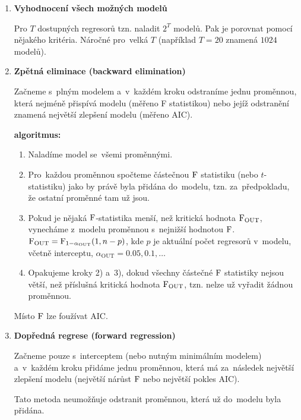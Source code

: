 \begin{enumerate}[1)]

\item
\textbf{Vyhodnocení všech možných modelů}

Pro $T$ dostupných regresorů tzn. naladit $2^T$ modelů. Pak je porovnat pomocí nějakého kritéria. Náročné pro~velká $T$ (například $T = 20$ znamená $1024$ modelů).

\item
\textbf{Zpětná eliminace (backward elimination)}

Začneme s~plným modelem a~v~každém kroku odstraníme jednu proměnnou, která nejméně přispívá modelu (měřeno F statistikou) nebo jejíž odstranění znamená největší zlepšení modelu (měřeno AIC).

\textbf{algoritmus:}
\begin{enumerate}[	1)]
	\item Naladíme model se~všemi proměnnými.
	\item Pro~každou proměnnou spočteme částečnou $\mathrm{F}$ statistiku (nebo $t$-statistiku) jako by právě byla přidána do~modelu, tzn. za~předpokladu, že ostatní proměnné tam už jsou.
	\item Pokud je nějaká $\mathrm{F}$-statistika menší, než kritická hodnota $\mathrm{F}_\mathrm{OUT}$, vynecháme z~modelu proměnnou s~nejnižší hodnotou $\mathrm{F}$. $\mathrm{F}_\mathrm{OUT} = \mathrm{F}_{1-\alpha_{\mathrm{OUT}}}(1,n-p)$, kde $p$ je aktuální počet regresorů v~modelu, včetně interceptu, $\alpha_\text{OUT} = 0.05,0.1,\dots$
	\item Opakujeme kroky 2) a~3), dokud všechny částečné $\mathrm{F}$ statistiky nejsou větší, než příslušná kritická hodnota $\mathrm{F}_\mathrm{OUT}$, tzn. nelze už vyřadit žádnou proměnnou.
\end{enumerate}
\begin{remark}
	Místo $\mathrm{F}$ lze foužívat AIC.
\end{remark}

\item
\textbf{Dopředná regrese (forward regression)}

Začneme pouze s~interceptem (nebo nutným minimálním modelem) a~v~každém kroku přidáme jednu proměnnou, která má za~následek největší zlepšení modelu (největší nárůst $\mathrm{F}$ nebo největší pokles AIC).

Tato metoda neumožňuje odstranit proměnnou, která už do~modelu byla přidána.


\end{enumerate}
